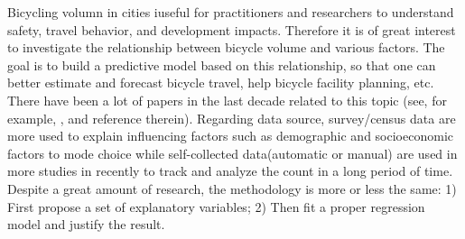 \documentclass[12pt,letterpaper,article,twocolumn]{memoir}
\begin{document}
Bicycling volumn in cities iuseful for practitioners and researchers
to understand safety, travel behavior, and development impacts.
Therefore it is of great interest to investigate the relationship
between bicycle volume and various factors. The goal is to build a
predictive model based on this relationship, so that one can better
estimate and forecast bicycle travel, help bicycle facility planning,
etc. There have been a lot of papers in the last decade related to
this topic (see, for example,
\cite{Griswold:2011aa,Fields:2012aa,Niemeier:1996aa,Nosal:2014aa}, and
reference therein). Regarding data source, survey/census data are more
used to explain influencing factors such as demographic and
socioeconomic factors to mode choice \cite{Parkin:2008aa,Helbich:2014aa} while
self-collected data(automatic or manual) are used in more studies in
recently to track and analyze the count in a long period of
time\cite{Griswold:2011aa,Nosal:2014aa}. Despite a great amount of research,
the methodology is more or less the same: 1) First propose a set of
explanatory variables; 2) Then fit a proper regression model and
justify the result.
\end{document}
